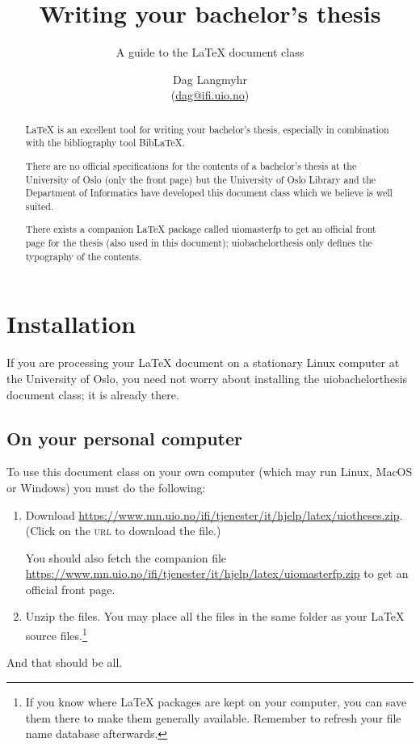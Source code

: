 \documentclass[UKenglish]{uiobachelorthesis}
\title{Writing your bachelor's thesis}
\subtitle{A guide to the \LaTeX{} document class \pb{uiobachelorthesis}}
\author{Dag Langmyhr\\ (\url{dag@ifi.uio.no})}
\newcommand{\p}[1]{\textsf{#1}}
\begin{document}
\uiomasterfp[kind=Documentation, compact, nosp, colour=grey, date=\today]

\begin{abstract}
  \LaTeX{} is an excellent tool for writing your bachelor's thesis, especially in
  combination with the bibliography tool Bib\LaTeX.

There are no official specifications for the contents of a bachelor's
thesis at the University of Oslo (only the front page) but 
the University of Oslo Library
and the Department of Informatics have developed this document class
which we believe is well suited.

There exists a companion \LaTeX{} package called \p{uiomasterfp} to
get an official front page for the thesis (also used in this
document);
\p{uiobachelorthesis} only defines the typography of the contents.
\end{abstract}

\tableofcontents
 
\section{Installation}
If you are processing your \LaTeX{} document on a stationary Linux
computer at the University of Oslo, you need not worry about
installing the \p{uiobachelorthesis} document class; it is already there.

\subsection{On your personal computer\label{privat-pc}}
To use this document class on your own computer (which may run Linux, MacOS
or Windows) you must do the following:
\begin{enumerate}
\item Download
  \url{https://www.mn.uio.no/ifi/tjenester/it/hjelp/latex/uiotheses.zip}. (Click
  on the \textsc{url} to download the file.)

  You should also fetch the companion file
  \url{https://www.mn.uio.no/ifi/tjenester/it/hjelp/latex/uiomasterfp.zip}
  to get an official front page.
  
\item Unzip the files. You may place all the files in the same folder
  as your \LaTeX{} source files.\footnote{If you know where \LaTeX{}
    packages are kept on your computer, you 
    can save them there to make them generally available. Remember to
    refresh your file name database afterwards.}
\end{enumerate}
And that should be all.
\end{document}

